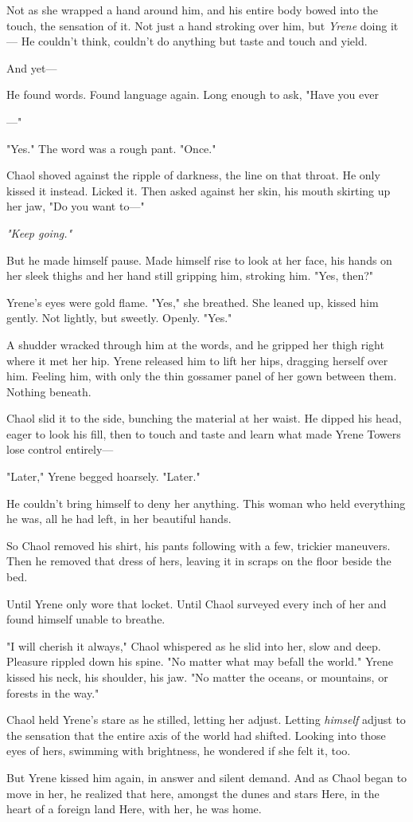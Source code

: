 Not as she wrapped a hand around him, and his entire body bowed into the touch, the sensation of it. Not just a hand stroking over him, but
\emph{Yrene} doing it--- He couldn't think, couldn't do anything but taste and touch and yield.

And yet---

He found words. Found language again. Long enough to ask, "Have you ever

---"

"Yes." The word was a rough pant. "Once."

Chaol shoved against the ripple of darkness, the line on that throat. He only kissed it instead. Licked it. Then asked against her skin, his mouth skirting up her jaw, "Do you want to---"

\emph{"Keep going."}

But he made himself pause. Made himself rise to look at her face, his hands on her sleek thighs and her hand still gripping him, stroking him. "Yes, then?"

Yrene's eyes were gold flame. "Yes," she breathed. She leaned up, kissed him gently. Not lightly, but sweetly. Openly. "Yes."

A shudder wracked through him at the words, and he gripped her thigh right where it met her hip. Yrene released him to lift her hips, dragging herself over him. Feeling him, with only the thin gossamer panel of her gown between them. Nothing beneath.

Chaol slid it to the side, bunching the material at her waist. He dipped his head, eager to look his fill, then to touch and taste and learn what made Yrene Towers lose control entirely---

"Later," Yrene begged hoarsely. "Later."

He couldn't bring himself to deny her anything. This woman who held everything he was, all he had left, in her beautiful hands.

So Chaol removed his shirt, his pants following with a few, trickier maneuvers. Then he removed that dress of hers, leaving it in scraps on the floor beside the bed.

Until Yrene only wore that locket. Until Chaol surveyed every inch of her and found himself unable to breathe.

"I will cherish it always," Chaol whispered as he slid into her, slow and deep. Pleasure rippled down his spine. "No matter what may befall the world." Yrene kissed his neck, his shoulder, his jaw. "No matter the oceans, or mountains, or forests in the way."

Chaol held Yrene's stare as he stilled, letting her adjust. Letting
\emph{himself} adjust to the sensation that the entire axis of the world had shifted. Looking into those eyes of hers, swimming with brightness, he wondered if she felt it, too.

But Yrene kissed him again, in answer and silent demand. And as Chaol began to move in her, he realized that here, amongst the dunes and stars
 Here, in the heart of a foreign land  Here, with her, he was home.

